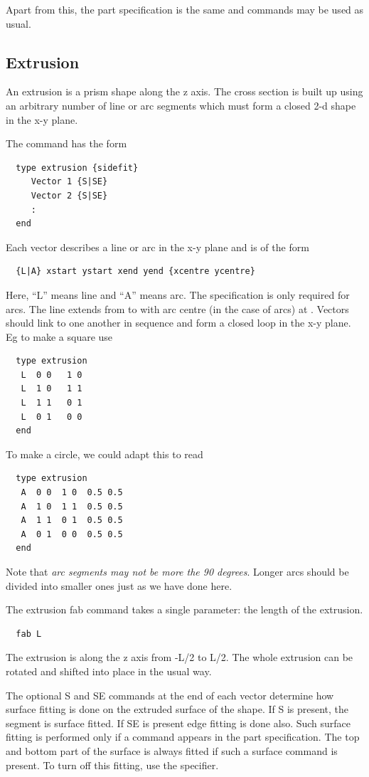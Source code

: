 \documentclass[a4paper,twoside,11pt]{book}
\begin{document}
Apart from this, the part specification is the same and  commands may be used as usual.

\subsection{Extrusion}

An extrusion is a prism shape along the z axis. The cross section is
built up using an arbitrary number of line or arc segments which must
form a closed 2-d shape in the x-y plane.

The  command has the form
\begin{verbatim}
  type extrusion {sidefit}
     Vector 1 {S|SE}
     Vector 2 {S|SE}
     :
  end
\end{verbatim}
Each vector describes a line or arc in the x-y plane and is of the form
\begin{verbatim}
  {L|A} xstart ystart xend yend {xcentre ycentre}
\end{verbatim}
Here, ``L'' means line and ``A'' means arc. The 
specification is only required for arcs. The line extends
from  to  with arc centre (in
the case of arcs) at . Vectors should link to
one another in sequence and form a closed loop in the x-y plane. Eg to
make a square use
\begin{verbatim}
  type extrusion
   L  0 0   1 0
   L  1 0   1 1
   L  1 1   0 1
   L  0 1   0 0
  end
\end{verbatim}
To make a circle, we could adapt this to read
\begin{verbatim}
  type extrusion
   A  0 0  1 0  0.5 0.5
   A  1 0  1 1  0.5 0.5
   A  1 1  0 1  0.5 0.5
   A  0 1  0 0  0.5 0.5
  end
\end{verbatim}
Note that \emph{arc segments may not be more the 90 degrees}. Longer
arcs should be divided into smaller ones just as we have done here.

The extrusion fab command takes a single parameter: the length of the
extrusion. 
\begin{verbatim}
  fab L
\end{verbatim}
The extrusion is along the z axis from -L/2 to L/2. The
whole extrusion can be rotated and shifted into place in the usual
way.

The optional S and SE commands at the end of each vector determine how surface
fitting is done on the extruded surface of the shape. If S is present,
the segment is surface fitted. If SE is present edge fitting is done
also. Such surface fitting is performed only if a 
command appears in the part specification. The top and bottom part of
the surface is always fitted if such a surface command is present. To
turn off this fitting, use the  specifier.
\end{document}

